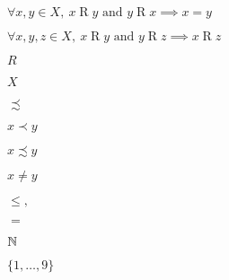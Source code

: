 \documentclass[10pt]{book}
\begin{document}
\begin{mdSnippets}
\begin{mdInlineSnippet}[1f4f735b8721f59c00530a82cdeaf9bb]%
$\forall x,y \in X,\ x \mathrel{R} y \text{ and } y \mathrel{R} x \implies x = y$\end{mdInlineSnippet}%
\begin{mdInlineSnippet}[e21ea475b8c53e1ef6b1a9c65f995006]%
$\forall x,y,z \in X,\ x \mathrel{R} y \text{ and } y \mathrel{R} z \implies x \mathrel{R} z$\end{mdInlineSnippet}%
\begin{mdInlineSnippet}[e1e1d3d40573127e9ee0480caf1283d6]%
$R$\end{mdInlineSnippet}%
\begin{mdInlineSnippet}[02129bb861061d1a052c592e2dc6b383]%
$X$\end{mdInlineSnippet}%
\begin{mdInlineSnippet}[cb5526f0c400b9e646e11658f182e47e]%
$\precsim$\end{mdInlineSnippet}%
\begin{mdInlineSnippet}[5df85ed45d6d30876280344b5a097b39]%
$x \prec y$\end{mdInlineSnippet}%
\begin{mdInlineSnippet}[301a825cb8f859789f0816615fd244a4]%
$x \precsim y$\end{mdInlineSnippet}%
\begin{mdInlineSnippet}[49f9daafbbb6159b69354a851a5d57bb]%
$x \ne y$\end{mdInlineSnippet}%
\begin{mdInlineSnippet}[7076f9d2217a9011fe0061d20db1418a]%
$\le,$\end{mdInlineSnippet}%
\begin{mdInlineSnippet}%
$=$\end{mdInlineSnippet}%
\begin{mdInlineSnippet}[44d0dc437936b13f7cea2f77053806bd]%
$\mathbb{N}$\end{mdInlineSnippet}%
\begin{mdInlineSnippet}[c1719017237cda67834c5bf33c5c7c57]%
$\{1, \dots, 9\}$\end{mdInlineSnippet}%
\begin{mdInlineSnippet}%

\end{mdInlineSnippet}
\end{mdSnippets}
\end{document}
